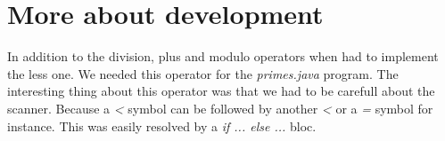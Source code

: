 \documentclass[10pt,a4paper]{article}
\begin{document}
\section{More about development}

In addition to the division, plus and modulo operators when had to implement the less one. We needed this operator for the \emph{primes.java} program. The interesting thing about this operator was that we had to be carefull about the scanner. Because a \emph{<} symbol can be followed by another \emph{<} or a \emph{=} symbol for instance. This was easily resolved by a \emph{if ... else ...} bloc.
\end{document}
